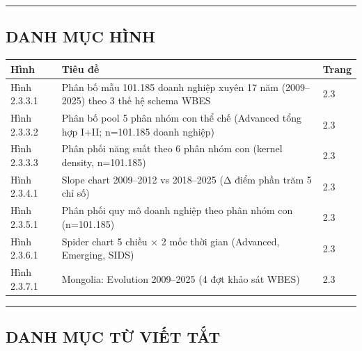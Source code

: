 \documentclass[12pt,a4paper]{article}
\begin{document}
\begin{center}\rule{0.5\linewidth}{0.5pt}\end{center}

\hypertarget{danh-mux1ee5c-huxecnh}{%
\subsection{DANH MỤC HÌNH}\label{danh-mux1ee5c-huxecnh}}

\begin{longtable}[]{@{}lll@{}}
\toprule\noalign{}
Hình & Tiêu đề & Trang \\
\midrule\noalign{}
\endhead
\bottomrule\noalign{}
\endlastfoot
Hình 2.3.3.1 & Phân bố mẫu 101.185 doanh nghiệp xuyên 17 năm
(2009--2025) theo 3 thế hệ schema WBES & 2.3 \\
Hình 2.3.3.2 & Phân bố pool 5 phân nhóm con thể chế (Advanced tổng hợp
I+II; n=101.185 doanh nghiệp) & 2.3 \\
Hình 2.3.3.3 & Phân phối năng suất theo 6 phân nhóm con (kernel density,
n=101.185) & 2.3 \\
Hình 2.3.4.1 & Slope chart 2009--2012 vs 2018--2025 (Δ điểm phần trăm 5
chỉ số) & 2.3 \\
Hình 2.3.5.1 & Phân phối quy mô doanh nghiệp theo phân nhóm con
(n=101.185) & 2.3 \\
Hình 2.3.6.1 & Spider chart 5 chiều × 2 mốc thời gian (Advanced,
Emerging, SIDS) & 2.3 \\
Hình 2.3.7.1 & Mongolia: Evolution 2009--2025 (4 đợt khảo sát WBES) &
2.3 \\
\end{longtable}

\begin{center}\rule{0.5\linewidth}{0.5pt}\end{center}

\hypertarget{danh-mux1ee5c-tux1eeb-viux1ebft-tux1eaft}{%
\subsection{DANH MỤC TỪ VIẾT
TẮT}\label{danh-mux1ee5c-tux1eeb-viux1ebft-tux1eaft}}
\end{document}
